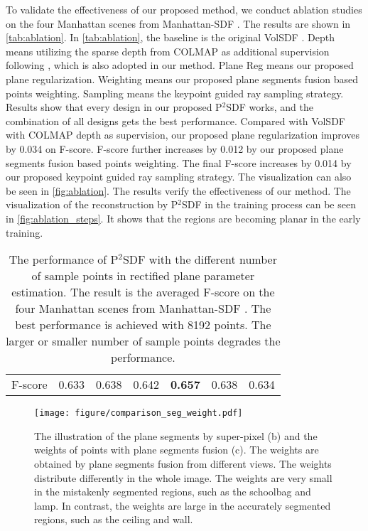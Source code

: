 \documentclass[10pt,journal,compsoc]{IEEEtran}
\begin{document}
To validate the effectiveness of our proposed method, we conduct ablation studies on the four Manhattan scenes from Manhattan-SDF \cite{guo2022neural}. The results are shown in \cref{tab:ablation}. In \cref{tab:ablation}, the baseline is the original VolSDF \cite{yariv2021volume}. Depth means utilizing the sparse depth from COLMAP \cite{schonberger2016structure} as additional supervision following \cite{roessle2022dense,lin2021efficient,wei2021nerfingmvs,guo2022neural}, which is also adopted in our method. Plane Reg means our proposed plane regularization. Weighting means our proposed plane segments fusion based points weighting. Sampling means the keypoint guided ray sampling strategy. Results show that every design in our proposed P$^2$SDF works, and the combination of all designs gets the best performance. Compared with VolSDF with COLMAP depth as supervision, our proposed plane regularization improves by 0.034 on F-score. F-score further increases by 0.012 by our proposed plane segments fusion based points weighting. The final F-score increases by 0.014 by our proposed keypoint guided ray sampling strategy.  
The visualization can also be seen in \cref{fig:ablation}. The results verify the effectiveness of our method. The visualization of the reconstruction by P$^2$SDF in the training process can be seen in \cref{fig:ablation_steps}. It shows that the regions are becoming planar in the early training.

\begin{table}[htbp]
	\centering
	\caption{The performance of P$^2$SDF with the different number of sample points in rectified plane parameter estimation. The result is the averaged F-score on the four Manhattan scenes from Manhattan-SDF \cite{guo2022neural}. The best performance is achieved with 8192 points. The larger or smaller number of sample points degrades the performance.}
	\begin{tabular}{c|cccccc}
		\toprule
		\makebox[0.2\linewidth][c]{\# of samples} & \makebox[0.02\linewidth][c]{1024} & \makebox[0.02\linewidth][c]{2048} & \makebox[0.02\linewidth][c]{4096} & \makebox[0.02\linewidth][c]{8192} & \makebox[0.02\linewidth][c]{16384} & \makebox[0.02\linewidth][c]{32768} \\
		\midrule
		F-score            & 0.633 & 0.638 & 0.642 & \textbf{0.657} & 0.638 & 0.634 \\
		\bottomrule
	\end{tabular}
	\label{tab:number_samples}
\end{table}
\begin{figure}[htbp]
	\centering
	\texttt{[image: figure/comparison\_seg\_weight.pdf]}
	\caption{The illustration of the plane segments by super-pixel (b) and the weights of points with plane segments fusion (c). The weights are obtained by plane segments fusion from different views. The weights distribute differently in the whole image. The weights are very small in the mistakenly segmented regions, such as the schoolbag and lamp. In contrast, the weights are large in the accurately segmented regions, such as the ceiling and wall.}
	\label{fig:comparison_seg_weight}
\end{figure}
\end{document}
